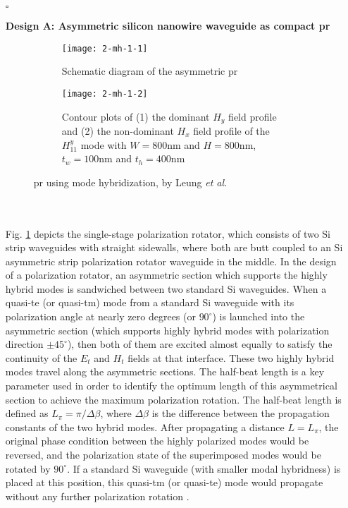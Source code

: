 \documentclass[../report.tex]{subfiles}
\begin{document}
\begin{itemize}[leftmargin=*]
	
	\item[$\square$] \begin{minipage}[t]{\textwidth}\textbf{Design A: Asymmetric silicon nanowire waveguide as compact \gls{pr}}
	\begin{figure}[H] %
		\begin{subfigure}[t]{0.45\textwidth}
			\texttt{[image: 2-mh-1-1]}
			\caption{Schematic diagram of the asymmetric \gls{pr}}
			\label{fig:2_mh_1_1}
		\end{subfigure}
		\hfill
		\begin{subfigure}[t]{0.45\textwidth}
			\texttt{[image: 2-mh-1-2]}
			\caption{Contour plots of (1) the dominant $H_y$ field profile and (2) the non-dominant $H_x$ field profile of the $H_{11}^{y}$ mode with $W=800 \si{\nano\meter}$ and $H=800 \si{\nano\meter}$, $t_w=100 \si{\nano\meter}$ and $t_h=400 \si{\nano\meter}$}
			\label{fig:2_mh_1_2}
		\end{subfigure}
		\caption{\gls{pr} using mode hybridization, by Leung \textit{et al.} \cite{leung_numerical_2011}}
	\end{figure}
	\end{minipage}\\\\
	Fig. \ref{fig:2_mh_1_1} depicts the single-stage polarization rotator, which consists of two Si strip waveguides with straight sidewalls, where both are butt coupled to an Si asymmetric strip polarization rotator waveguide in the middle. In the design of a polarization rotator, an asymmetric section which supports the highly hybrid modes is sandwiched between two standard Si waveguides. When a quasi-\gls{te} (or quasi-\gls{tm}) mode from a standard Si waveguide with its polarization angle at nearly zero degrees (or $90^{\circ}$) is launched into the asymmetric section (which supports highly hybrid modes with polarization direction $\pm 45^{\circ }$), then both of them are excited almost equally to satisfy the continuity of the $E_t$ and $H_t$ fields at that interface. These two highly hybrid modes travel along the asymmetric sections. The half-beat length is a key parameter used in order to identify the optimum length of this asymmetrical section to achieve the maximum polarization rotation. The half-beat length is defined as $L_{\pi }= \pi / \Delta \beta$, where $\Delta \beta$ is the difference between the propagation constants of the two hybrid modes. After propagating a distance $L = L_{\pi}$, the original phase condition between the highly polarized modes would be reversed, and the polarization state of the superimposed modes would be rotated by $90^{\circ}$. If a standard Si waveguide (with smaller modal hybridness) is placed at this position, this quasi-\gls{tm} (or quasi-\gls{te}) mode would propagate without any further polarization rotation \cite{leung_numerical_2011}.
	

\end{itemize}
\end{document}
